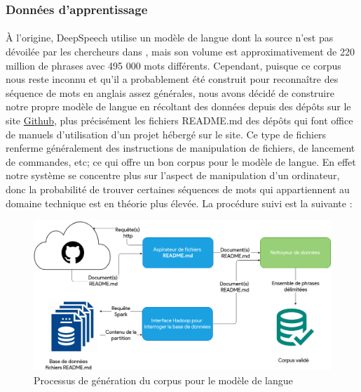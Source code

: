 		\subsubsection*{Données d'apprentissage}
		\paragraph{}
		À l'origine, DeepSpeech utilise un modèle de langue dont la source n'est pas dévoilée par les chercheurs dans \citep{deepspeech_paper}, mais son volume est approximativement de 220 million de phrases avec 495 000 mots différents. Cependant, puisque ce corpus nous reste inconnu et qu'il a probablement été construit pour reconnaître des séquence de mots en anglais assez générales, nous avons décidé de construire notre propre modèle de langue en récoltant des données depuis des dépôts sur le site \href{https://github.com/}{Github}, plus précisément les fichiers README.md des dépôts qui font office de manuels d'utilisation d'un projet hébergé sur le site. Ce type de fichiers renferme généralement des instructions de manipulation de fichiers, de lancement de commandes, etc; ce qui offre un bon corpus pour le modèle de langue. En effet notre système se concentre plus sur l'aspect de manipulation d'un ordinateur, donc la probabilité de trouver certaines séquences de mots qui appartiennent au domaine technique	 est en théorie plus élevée. La procédure suivi est la suivante : 
		\begin{figure}[H] 
			\label{fig:lm_gathering}
			\centering
			\includegraphics[width=0.88\linewidth]{images/Conception/ASR/lm_gathering.png}
			\caption{Processus de génération du corpus pour le modèle de langue}
		\end{figure}
